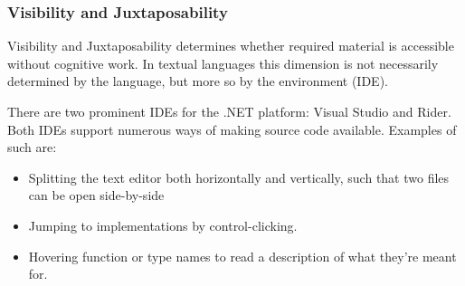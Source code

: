\subsubsection{Visibility and Juxtaposability}
Visibility and Juxtaposability determines whether required material is accessible without cognitive work\cite{green1996usability}. In textual languages this dimension is not necessarily determined by the language, but more so by the environment (\gls{IDE}).

There are two prominent \glspl{IDE} for the .NET platform: Visual Studio and Rider. Both \glspl{IDE} support numerous ways of making source code available. Examples of such are:
\begin{itemize}
    \item Splitting the text editor both horizontally and vertically, such that two files can be open side-by-side
    \item Jumping to implementations by control-clicking. 
    \item Hovering function or type names to read a description of what they're meant for. 
\end{itemize}
